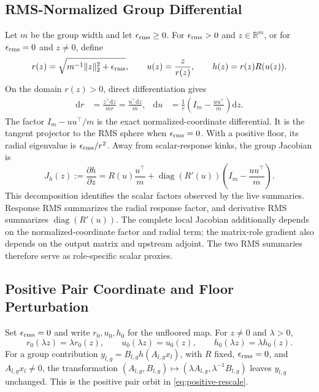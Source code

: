 \documentclass{article}
\newcommand{\diag}{\operatorname{diag}}
\begin{document}
\subsection{RMS-Normalized Group Differential}
\label{app:rlb-group-differential}

Let $m$ be the group width and let $\epsilon_{\rm rms}\ge0$.  For
$\epsilon_{\rm rms}>0$ and $z\in\mathbb R^m$, or for
$\epsilon_{\rm rms}=0$ and $z\ne0$, define
\begin{equation}
    r(z)=\sqrt{m^{-1}\lVert z\rVert_2^2+\epsilon_{\rm rms}},
    \qquad
    u(z)=\frac{z}{r(z)},
    \qquad
    h(z)=r(z)R(u(z)).
\end{equation}
On the domain $r(z)>0$, direct differentiation gives
\begin{equation}
\begin{aligned}
    \mathrm{d}r
    &=
    \frac{z^\top\mathrm{d}z}{mr}
    =
    \frac{u^\top\mathrm{d}z}{m},
    &
    \mathrm{d}u
    &=
    \frac{1}{r}
    \left(I_m-\frac{uu^\top}{m}\right)\mathrm{d}z .
\end{aligned}
    \label{eq:appendix-du}
\end{equation}
The factor $I_m-uu^\top/m$ is the exact normalized-coordinate differential.  It
is the tangent projector to the RMS sphere when $\epsilon_{\rm rms}=0$.  With a
positive floor, its radial eigenvalue is $\epsilon_{\rm rms}/r^2$.  Away from
scalar-response kinks, the group Jacobian is
\begin{equation}
    J_h(z)
    :=
    \frac{\partial h}{\partial z}
    =
    R(u)\frac{u^\top}{m}
    +
    \diag(R'(u))
    \left(I_m-\frac{uu^\top}{m}\right).
    \label{eq:appendix-group-jacobian}
\end{equation}
This decomposition identifies the scalar factors observed by the live
summaries.  Response RMS summarizes the radial response factor, and derivative
RMS summarizes $\diag(R'(u))$.  The complete local Jacobian additionally
depends on the normalized-coordinate factor and radial term; the matrix-role
gradient also depends on the output matrix and upstream adjoint.  The two RMS
summaries therefore serve as role-specific scalar proxies.

\subsection{Positive Pair Coordinate and Floor Perturbation}
\label{app:rlb-positive-coordinate}

Set $\epsilon_{\rm rms}=0$ and write $r_0,u_0,h_0$ for the unfloored map.  For
$z\ne0$ and $\lambda>0$,
\begin{equation}
    r_0(\lambda z)=\lambda r_0(z),
    \qquad
    u_0(\lambda z)=u_0(z),
    \qquad
    h_0(\lambda z)=\lambda h_0(z).
\end{equation}
For a group contribution $y_{l,g}=B_{l,g}h(A_{l,g}x_l)$, with $R$ fixed,
$\epsilon_{\rm rms}=0$, and $A_{l,g}x_l\ne0$, the transformation
$(A_{l,g},B_{l,g})\mapsto
(\lambda A_{l,g},\lambda^{-1}B_{l,g})$ leaves $y_{l,g}$ unchanged.  This is
the positive pair orbit in \eqref{eq:positive-rescale}.
\end{document}
